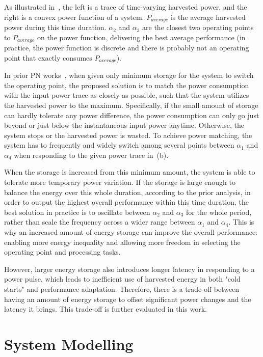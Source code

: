 As illustrated in~, the left is a trace of time-varying harvested power, and the right is a convex power function of a system. $P_{average}$ is the average harvested power during this time duration. $\alpha_2$ and $\alpha_3$ are the closest two operating points to $P_{average}$ on the power function, delivering the best average performance (in practice, the power function is discrete and there is probably not an operating point that exactly consumes $P_{average}$).

In prior PN works~\cite{balsamo2016graceful, fletcher2017power}, when given only minimum storage for the system to switch the operating point, the proposed solution is to match the power consumption with the input power trace as closely as possible, such that the system utilizes the harvested power to the maximum. Specifically, if the small amount of storage can hardly tolerate any power difference, the power consumption can only go just beyond or just below the instantaneous input power anytime. Otherwise, the system stops or the harvested power is wasted. To achieve power matching, the system has to frequently and widely switch among several points between $\alpha_1$ and $\alpha_4$ when responding to the given power trace in~(b).

When the storage is increased from this minimum amount, the system is able to tolerate more temporary power variation. If the storage is large enough to balance the energy over this whole duration, according to the prior analysis, in order to output the highest overall performance within this time duration, the best solution in practice is to oscillate between $\alpha_2$ and $\alpha_3$ for the whole period, rather than scale the frequency across a wider range between $\alpha_1$ and $\alpha_4$. This is why an increased amount of energy storage can improve the overall performance: enabling more energy inequality and allowing more freedom in selecting the operating point and processing tasks. 

However, larger energy storage also introduces longer latency in responding to a power pulse, which leads to inefficient use of harvested energy in both "cold starts" and performance adaptation. Therefore, there is a trade-off between having an amount of energy storage to offset significant power changes and the latency it brings. This trade-off is further evaluated in this work.

\section{System Modelling}

